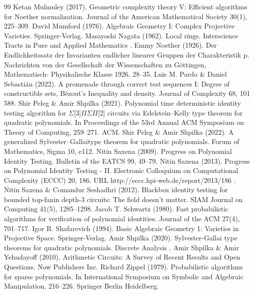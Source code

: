 \documentclass[10pt,a4paper]{article}
\begin{document}
\begin{thebibliography}{99}
 Ketan Mulmuley (2017). Geometric complexity theory V: Efficient algorithms for Noether normalization. Journal of the American Mathematical Society 30(1), 225–309.
 David Mumford (1976). Algebraic Geometry I: Complex Projective Varieties. Springer-Verlag.
 Masayoshi Nagata (1962). Local rings. Interscience Tracts in Pure and Applied Mathematics .
 Emmy Noether (1926). Der Endlichkeitssatz der Invarianten endlicher linearer Gruppen der Charakteristik p. Nachrichten von der Gesellschaft der Wissenschaften zu Göttingen, Mathematisch- Physikalische Klasse 1926, 28–35.
 Luis M. Pardo \& Daniel Sebastián (2022). A promenade through correct test sequences I: Degree of constructible sets, Bézout’s Inequality and density. Journal of Complexity 68, 101 588.
 Shir Peleg \& Amir Shpilka (2021). Polynomial time deterministic identity testing algorithm for $\Sigma$[3]$\Pi$$\Sigma$$\Pi$[2] circuits via Edelstein–Kelly type theorem for quadratic polynomials. In Proceedings of the 53rd Annual ACM Symposium on Theory of Computing, 259–271. ACM.
 Shir Peleg \& Amir Shpilka (2022). A generalized Sylvester–Gallaitype theorem for quadratic polynomials. Forum of Mathematics, Sigma 10, e112.
 Nitin Saxena (2009). Progress on Polynomial Identity Testing. Bulletin of the EATCS 99, 49–79.
 Nitin Saxena (2013). Progress on Polynomial Identity Testing - II. Electronic Colloquium on Computational Complexity (ECCC) 20, 186. URL http://eccc.hpi-web.de/report/2013/186 .
 Nitin Saxena \& Comandur Seshadhri (2012). Blackbox identity testing for bounded top-fanin depth-3 circuits: The field doesn’t matter. SIAM Journal on Computing 41(5), 1285–1298.
 Jacob T. Schwartz (1980). Fast probabilistic algorithms for verification of polynomial identities. Journal of the ACM 27(4), 701–717.
 Igor R. Shafarevich (1994). Basic Algebraic Geometry 1: Varieties in Projective Space. Springer-Verlag.
 Amir Shpilka (2020). Sylvester-Gallai type theorems for quadratic polynomials. Discrete Analysis .
 Amir Shpilka \& Amir Yehudayoff (2010). Arithmetic Circuits: A Survey of Recent Results and Open Questions. Now Publishers Inc.
 Richard Zippel (1979). Probabilistic algorithms for sparse polynomials. In International Symposium on Symbolic and Algebraic Manipulation, 216–226. Springer Berlin Heidelberg.
\end{thebibliography}
\end{document}
